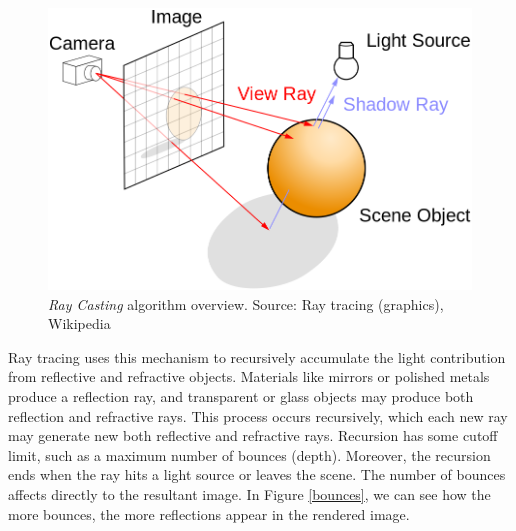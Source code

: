 \documentclass[titlepage,12pt]{report}
\begin{document}
\begin{figure}[!ht]
	\centering
	\includegraphics[scale=0.35]{media/Ray_trace_diagram.png}
	\caption{\textit{Ray Casting} algorithm overview. Source: Ray tracing (graphics), Wikipedia}
	\label{globalil}
\end{figure}

Ray tracing uses this mechanism to recursively accumulate the light contribution from reflective and refractive objects. Materials like mirrors or polished metals produce a reflection ray, and transparent or glass objects may produce both reflection and refractive rays. This process occurs recursively, which each new ray may generate new both reflective and refractive rays. Recursion has some cutoff limit, such as a maximum number of bounces (depth). Moreover, the recursion ends when the ray hits a light source or leaves the scene. The number of bounces affects directly to the resultant image. In Figure \ref{bounces}, we can see how the more bounces, the more reflections appear in the rendered image.
\end{document}
